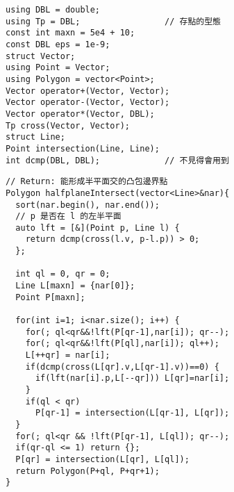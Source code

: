 \begin{center}
\begin{lstlisting}
using DBL = double;
using Tp = DBL;                 // 存點的型態
const int maxn = 5e4 + 10;
const DBL eps = 1e-9;
struct Vector;
using Point = Vector;
using Polygon = vector<Point>;
Vector operator+(Vector, Vector);
Vector operator-(Vector, Vector);
Vector operator*(Vector, DBL);
Tp cross(Vector, Vector);
struct Line;
Point intersection(Line, Line);
int dcmp(DBL, DBL);             // 不見得會用到
\end{lstlisting}
\begin{lstlisting}
// Return: 能形成半平面交的凸包邊界點
Polygon halfplaneIntersect(vector<Line>&nar){
  sort(nar.begin(), nar.end());
  // p 是否在 l 的左半平面
  auto lft = [&](Point p, Line l) {
    return dcmp(cross(l.v, p-l.p)) > 0;
  };

  int ql = 0, qr = 0;
  Line L[maxn] = {nar[0]};
  Point P[maxn]; 

  for(int i=1; i<nar.size(); i++) {
    for(; ql<qr&&!lft(P[qr-1],nar[i]); qr--);
    for(; ql<qr&&!lft(P[ql],nar[i]); ql++);
    L[++qr] = nar[i];
    if(dcmp(cross(L[qr].v,L[qr-1].v))==0) {
      if(lft(nar[i].p,L[--qr])) L[qr]=nar[i];
    }
    if(ql < qr)
      P[qr-1] = intersection(L[qr-1], L[qr]);
  }
  for(; ql<qr && !lft(P[qr-1], L[ql]); qr--);
  if(qr-ql <= 1) return {};
  P[qr] = intersection(L[qr], L[ql]);
  return Polygon(P+ql, P+qr+1);
}
\end{lstlisting}
\end{center}